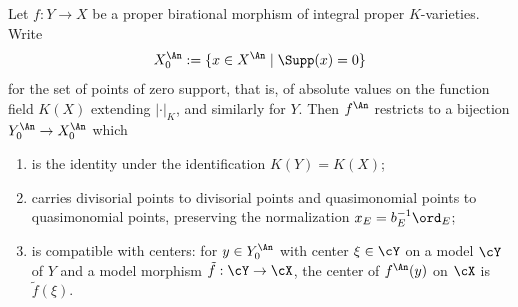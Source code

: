 \begin{lemma}
\label{lem:ch30-birational-bijection}
Let $f:Y\to X$ be a proper birational morphism of integral proper
$K$-varieties.  Write
\[
 X^{\An}_0:=\{x\in X^{\An}\mid \Supp(x)=0\}
\]
for the set of points of zero support, that is, of absolute values on the
function field $K(X)$ extending $|\cdot|_K$, and similarly for $Y$.
Then $f^{\An}$ restricts to a bijection
$Y^{\An}_0\to X^{\An}_0$ which
\begin{enumerate}
\item\label{itm:ch30-bb:val}
is the identity under the identification $K(Y)=K(X)$;
\item\label{itm:ch30-bb:divisorial}
carries divisorial points to divisorial points and quasimonomial points to
quasimonomial points, preserving the normalization $x_E=b_E^{-1}\ord_E$;
\item\label{itm:ch30-bb:centers}
is compatible with centers: for $y\in Y^{\An}_0$ with center
$\xi\in\cY$ on a model $\cY$ of $Y$ and a model morphism
$\tilde f:\cY\to\cX$, the center of $f^{\An}(y)$ on $\cX$ is
$\tilde f(\xi)$.
\end{enumerate}
\end{lemma}

